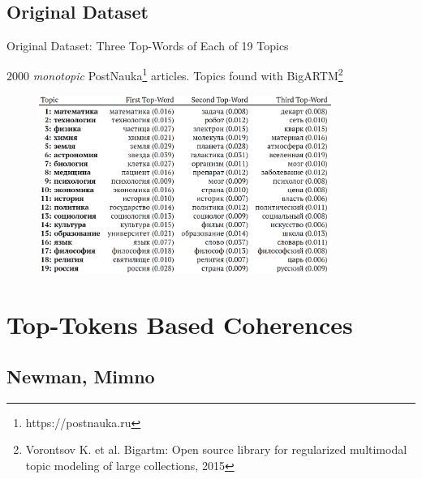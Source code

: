 \documentclass[russian]{beamer}
\begin{document}
\subsection{Original Dataset}


\begin{frame}{Original Dataset: Three Top-Words of Each of 19 Topics}

  {\small
    $2000$ \emph{monotopic} PostNauka\footnote[frame]{https://postnauka.ru} articles. Topics found with BigARTM\footnote[frame]{Vorontsov K. et al. Bigartm: Open source library for regularized multimodal topic modeling of large collections, 2015}
  }
  
  \begin{figure}[h]
    \centering
    \includegraphics[width=0.85\textwidth]{topwords.jpg}
  \end{figure}
\end{frame}


\section{Top-Tokens Based Coherences}


\subsection{Newman, Mimno}
\end{document}
